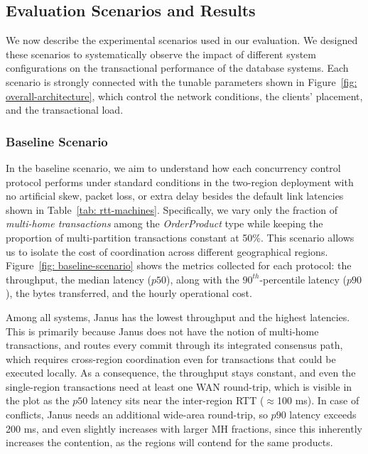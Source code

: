 \documentclass{article}
\begin{document}
\subsection{Evaluation Scenarios and Results}
\label{subsec: evaluation-scenarios-and-results}
We now describe the experimental scenarios used in our evaluation. We designed these scenarios to systematically observe the impact of different system configurations on the transactional performance of the database systems. Each scenario is strongly connected with the tunable parameters shown in Figure~\ref{fig: overall-architecture}, which control the network conditions, the clients' placement, and the transactional load.

\subsubsection{Baseline Scenario}
\label{subsubsec: baseline-scenario}
In the baseline scenario, we aim to understand how each concurrency control protocol performs under standard conditions in the two-region deployment with no artificial skew, packet loss, or extra delay besides the default link latencies shown in Table~\ref{tab: rtt-machines}. Specifically, we vary only the fraction of \textit{multi-home transactions} among the \textit{OrderProduct} type while keeping the proportion of multi-partition transactions constant at 50\%. This scenario allows us to isolate the cost of coordination across different geographical regions. Figure~\ref{fig: baseline-scenario} shows the metrics collected for each protocol: the throughput, the median latency ($p50$), along with the $90^{th}$-percentile latency ($p90$), the bytes transferred, and the hourly operational cost.

Among all systems, Janus has the lowest throughput and the highest latencies. This is primarily because Janus does not have the notion of multi-home transactions, and routes every commit through its integrated consensus path, which requires cross-region coordination even for transactions that could be executed locally. As a consequence, the throughput stays constant, and even the single-region transactions need at least one WAN round-trip, which is visible in the plot as the $p50$ latency sits near the inter-region RTT ($\approx$100 ms). In case of conflicts, Janus needs an additional wide-area round-trip, so $p90$ latency exceeds 200 ms, and even slightly increases with larger MH fractions, since this inherently increases the contention, as the regions will contend for the same products.
\end{document}
